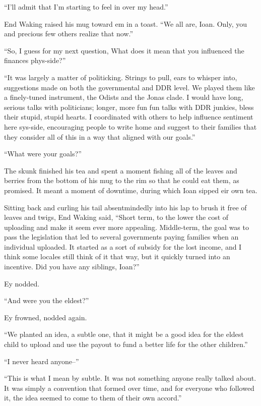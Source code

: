 ``I'll admit that I'm starting to feel in over my head.''

End Waking raised his mug toward em in a toast. ``We all are, Ioan. Only, you and precious few others realize that now.''

``So, I guess for my next question, What does it mean that you influenced the finances phys-side?''

``It was largely a matter of politicking. Strings to pull, ears to whisper into, suggestions made on both the governmental and DDR level. We played them like a finely-tuned instrument, the Odists and the Jonas clade. I would have long, serious talks with politicians; longer, more fun fun talks with DDR junkies, bless their stupid, stupid hearts. I coordinated with others to help influence sentiment here sys-side, encouraging people to write home and suggest to their families that they consider all of this in a way that aligned with our goals.''

``What were your goals?''

The skunk finished his tea and spent a moment fishing all of the leaves and berries from the bottom of his mug to the rim so that he could eat them, as promised. It meant a moment of downtime, during which Ioan sipped eir own tea.

Sitting back and curling his tail absentmindedly into his lap to brush it free of leaves and twigs, End Waking said, ``Short term, to the lower the cost of uploading and make it seem ever more appealing. Middle-term, the goal was to pass the legislation that led to several governments paying families when an individual uploaded. It started as a sort of subsidy for the lost income, and I think some locales still think of it that way, but it quickly turned into an incentive. Did you have any siblings, Ioan?''

Ey nodded.

``And were you the eldest?''

Ey frowned, nodded again.

``We planted an idea, a subtle one, that it might be a good idea for the eldest child to upload and use the payout to fund a better life for the other children.''

``I never heard anyone--''

``This is what I mean by subtle. It was not something anyone really talked about. It was simply a convention that formed over time, and for everyone who followed it, the idea seemed to come to them of their own accord.''

